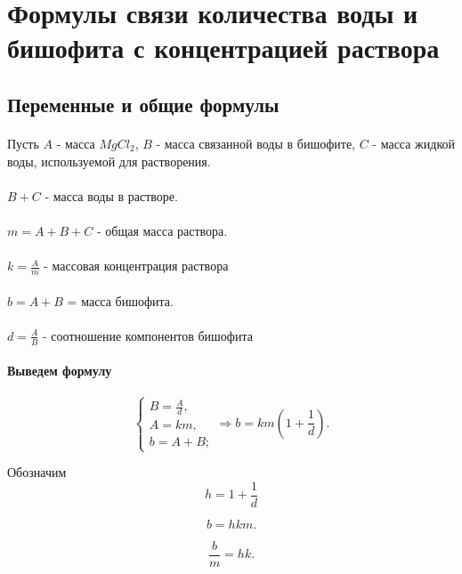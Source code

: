 \section{Формулы связи количества воды и бишофита с концентрацией раствора}

\subsection{Переменные и общие формулы}
\paragraph{} Пусть 
$A$ - масса $MgCl_2$, 
$B$ - масса связанной воды в бишофите, 
$C$ - масса жидкой воды, используемой для растворения.

\paragraph{}$B+C$ - масса воды в растворе.
\paragraph{}$m=A+B+C$ - общая масса раствора.
\paragraph{}$k = \frac{A}{m}$ - массовая концентрация раствора
\paragraph{}$b = A+B$ = масса бишофита.
\paragraph{}$d = \frac{A}{B}$ - соотношение компонентов бишофита 

\paragraph{Выведем формулу}
$$
\left\{
\begin{array}{l}
B = \frac{A}{d},\\
A =  km,\\
b = A + B;
\end{array}
\right.
\Rightarrow
b = km \left(1 + \frac{1}{d} \right ).
$$

Обозначим $$ h = 1 + \frac{1}{d}$$

$$b = h k m.$$

$$\frac{b}{m} = h k.$$

